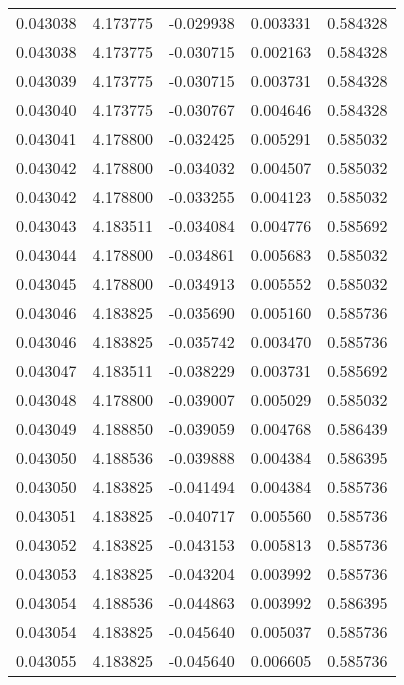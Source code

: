 \begin{tabular}{lrrrr}
0.043038    &  4.173775 & -0.029938 &  0.003331 &             0.584328 \\
0.043038    &  4.173775 & -0.030715 &  0.002163 &             0.584328 \\
0.043039    &  4.173775 & -0.030715 &  0.003731 &             0.584328 \\
0.043040    &  4.173775 & -0.030767 &  0.004646 &             0.584328 \\
0.043041    &  4.178800 & -0.032425 &  0.005291 &             0.585032 \\
0.043042    &  4.178800 & -0.034032 &  0.004507 &             0.585032 \\
0.043042    &  4.178800 & -0.033255 &  0.004123 &             0.585032 \\
0.043043    &  4.183511 & -0.034084 &  0.004776 &             0.585692 \\
0.043044    &  4.178800 & -0.034861 &  0.005683 &             0.585032 \\
0.043045    &  4.178800 & -0.034913 &  0.005552 &             0.585032 \\
0.043046    &  4.183825 & -0.035690 &  0.005160 &             0.585736 \\
0.043046    &  4.183825 & -0.035742 &  0.003470 &             0.585736 \\
0.043047    &  4.183511 & -0.038229 &  0.003731 &             0.585692 \\
0.043048    &  4.178800 & -0.039007 &  0.005029 &             0.585032 \\
0.043049    &  4.188850 & -0.039059 &  0.004768 &             0.586439 \\
0.043050    &  4.188536 & -0.039888 &  0.004384 &             0.586395 \\
0.043050    &  4.183825 & -0.041494 &  0.004384 &             0.585736 \\
0.043051    &  4.183825 & -0.040717 &  0.005560 &             0.585736 \\
0.043052    &  4.183825 & -0.043153 &  0.005813 &             0.585736 \\
0.043053    &  4.183825 & -0.043204 &  0.003992 &             0.585736 \\
0.043054    &  4.188536 & -0.044863 &  0.003992 &             0.586395 \\
0.043054    &  4.183825 & -0.045640 &  0.005037 &             0.585736 \\
0.043055    &  4.183825 & -0.045640 &  0.006605 &             0.585736 \\

\end{tabular}
